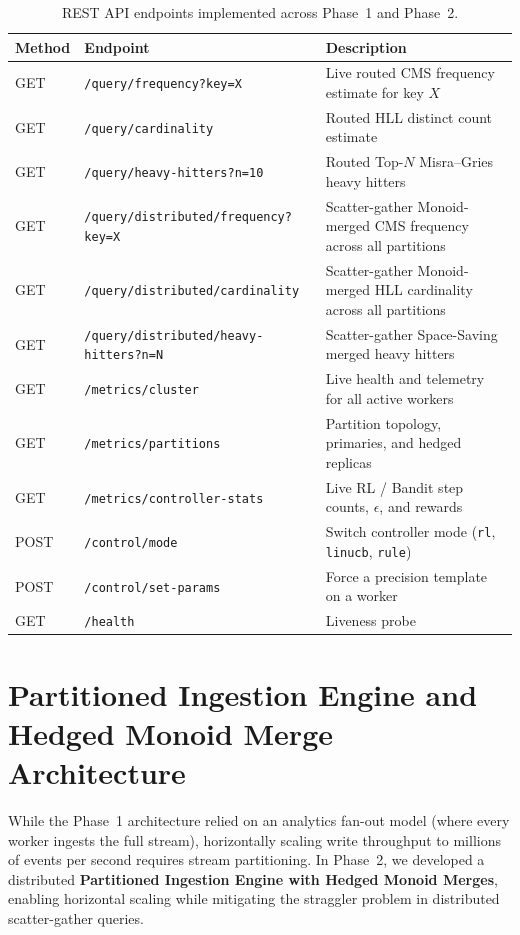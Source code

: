 \begin{table}[htbp]
\centering
\begin{tabular}{l l l}
\toprule
\textbf{Method} & \textbf{Endpoint} & \textbf{Description} \\
\midrule
GET  & \texttt{/query/frequency?key=X}   & Live routed CMS frequency estimate for key $X$ \\
GET  & \texttt{/query/cardinality}        & Routed HLL distinct count estimate \\
GET  & \texttt{/query/heavy-hitters?n=10} & Routed Top-$N$ Misra--Gries heavy hitters \\
GET  & \texttt{/query/distributed/frequency?key=X} & Scatter-gather Monoid-merged CMS frequency across all partitions \\
GET  & \texttt{/query/distributed/cardinality}      & Scatter-gather Monoid-merged HLL cardinality across all partitions \\
GET  & \texttt{/query/distributed/heavy-hitters?n=N}& Scatter-gather Space-Saving merged heavy hitters \\
GET  & \texttt{/metrics/cluster}          & Live health and telemetry for all active workers \\
GET  & \texttt{/metrics/partitions}       & Partition topology, primaries, and hedged replicas \\
GET  & \texttt{/metrics/controller-stats} & Live RL / Bandit step counts, $\epsilon$, and rewards \\
POST & \texttt{/control/mode}             & Switch controller mode (\texttt{rl}, \texttt{linucb}, \texttt{rule}) \\
POST & \texttt{/control/set-params}       & Force a precision template on a worker \\
GET  & \texttt{/health}                   & Liveness probe \\
\bottomrule
\end{tabular}
\caption{REST API endpoints implemented across Phase~1 and Phase~2.}
\label{tab:api_endpoints}
\end{table}

\section{Partitioned Ingestion Engine and Hedged Monoid Merge Architecture}
\label{sec:hedged_monoid_arch}

While the Phase~1 architecture relied on an analytics fan-out model (where every worker ingests the full stream), horizontally scaling write throughput to millions of events per second requires stream partitioning. In Phase~2, we developed a distributed \textbf{Partitioned Ingestion Engine with Hedged Monoid Merges}, enabling horizontal scaling while mitigating the straggler problem in distributed scatter-gather queries.


